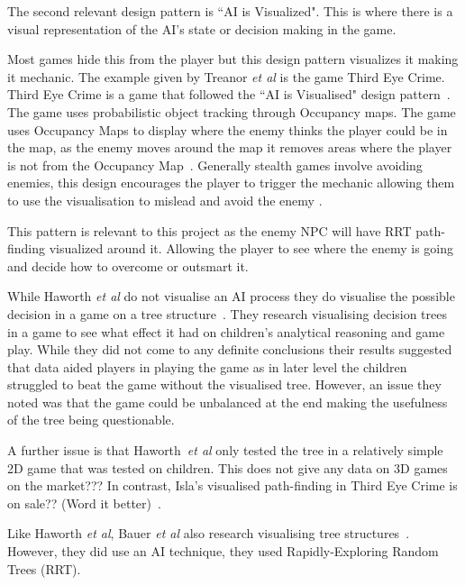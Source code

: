 \documentclass[journal]{IEEEtran}
\begin{document}
The second relevant design pattern is ``AI is Visualized". This is where there is a visual representation of the AI's state or decision making in the game. 

Most games hide this from the player but this design pattern visualizes it making it mechanic.  
The example given by Treanor \textit{et al} is the game Third Eye Crime.  Third Eye Crime is a game that followed the ``AI is Visualised" design pattern~\cite{Isla2014, game:ThirdEyeCrime}.  
The game uses probabilistic object tracking through Occupancy maps. The game uses Occupancy Maps to display where the enemy thinks the player could be in the map, as the enemy moves around the map it removes areas where the player is not from the Occupancy Map~\cite{Isla2014}.  Generally stealth games involve avoiding enemies,  this design encourages the player to trigger the mechanic allowing them to use the visualisation to mislead and avoid the enemy \cite{Isla2014, game:ThirdEyeCrime}.  

This pattern is relevant to this project as the enemy NPC will have RRT path-finding visualized around it. Allowing the player to see where the enemy is going and decide how to overcome or outsmart it.

While Haworth \textit{et al} do not visualise an AI process they do visualise the possible decision in a game on a tree structure~\cite{Haworth2010}. They research visualising decision trees in a game to see what effect it had on children's analytical reasoning and game play.  While they did not come to any definite conclusions their results suggested that data aided players in playing the game as in later level the children struggled to beat the game without the visualised tree. However, an issue they noted was that the game could be unbalanced at the end making the usefulness of the tree being questionable.  

A further issue is that Haworth~\textit{et al} only tested the tree in a relatively simple 2D game that was tested on children. This does not give any data on 3D games on the market??? In contrast, Isla's visualised path-finding in Third Eye Crime is on sale?? (Word it better)~\cite{Isla2014}.
 
Like  Haworth \textit{et al}, Bauer \textit{et al} also research visualising tree structures~\cite{bauer2012}. However, they did use an AI technique, they used Rapidly-Exploring Random Trees (RRT).
\end{document}
